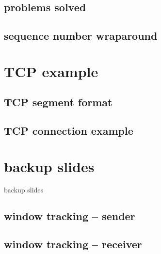 \subsection{problems solved}


\subsection{sequence number wraparound}


\section{TCP example}

\subsection{TCP segment format}


%

\subsection{TCP connection example}




\section{backup slides}
\begin{frame}{backup slides}
\end{frame}

\subsection{window tracking -- sender}


\subsection{window tracking -- receiver}




